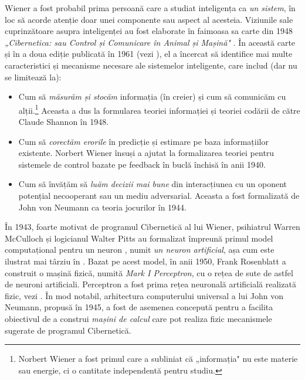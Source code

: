 \documentclass[../../book-main_ro.tex]{subfiles}
\begin{document}
Wiener a fost probabil prima persoană care a studiat inteligența ca {\em un sistem}, în loc să acorde atenție doar unei componente sau aspect al acesteia. Viziunile sale cuprinzătoare asupra inteligenței au fost elaborate în faimoasa sa carte din 1948 {\em „Cibernetica: sau Control și Comunicare în Animal și Mașină"} \cite{Wiener-Cybernetics-1948}. În această carte și în a doua ediție publicată în 1961 \cite{Wiener-Cybernetics-1961} (vezi ), el a încercat să identifice mai multe caracteristici și mecanisme necesare ale sistemelor inteligente, care includ (dar nu se limitează la):
\begin{itemize}
    \item Cum să {\em măsurăm și stocăm} informația (în creier) și cum să comunicăm cu alții.\footnote{Norbert Wiener a fost primul care a subliniat că „informația" nu este materie sau energie, ci o cantitate independentă pentru studiu.} Aceasta a dus la formularea teoriei informației și teoriei codării de către Claude Shannon în 1948.
    \item Cum să {\em corectăm erorile} în predicție și estimare pe baza informațiilor existente. Norbert Wiener însuși a ajutat la formalizarea teoriei pentru sistemele de control bazate pe feedback în buclă închisă în anii 1940.
    \item Cum să învățăm să {\em luăm decizii mai bune} din interacțiunea cu un oponent potențial necooperant sau un mediu adversarial. Aceasta a fost formalizată de John von Neumann ca teoria jocurilor în 1944.
\end{itemize}
În 1943, foarte motivat de programul Cibernetică al lui Wiener, psihiatrul Warren McCulloch și logicianul Walter Pitts au formalizat împreună primul model computațional pentru un neuron \cite{McCulloch-Pitts}, numit {\em un neuron artificial}, așa cum este ilustrat mai târziu în . Bazat pe acest model, în anii 1950, Frank Rosenblatt a construit o mașină fizică, numită {\em Mark I Perceptron}, cu o rețea de sute de astfel de neuroni artificiali. Perceptron a fost prima rețea neuronală artificială realizată fizic, vezi . În mod notabil, arhitectura computerului universal a lui John von Neumann, propusă în 1945, a fost de asemenea concepută pentru a facilita obiectivul de a construi {\em mașini de calcul} care pot realiza fizic mecanismele sugerate de programul Cibernetică.
\end{document}
